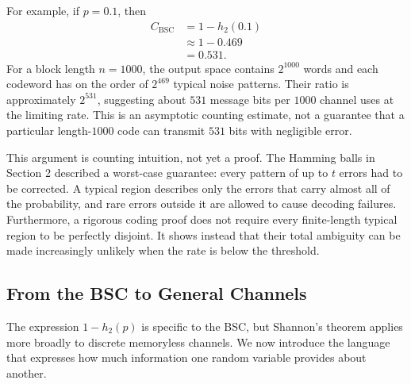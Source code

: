 For example, if $p=0.1$, then
\begin{align}
C_{\mathrm{BSC}}
&=1-h_2(0.1)
\label{eq:bsc-capacity-point-one-substitution}\\
&\approx1-0.469
\label{eq:bsc-capacity-point-one-approximation}\\
&=0.531.
\label{eq:bsc-capacity-point-one-value}
\end{align}
For a block length $n=1000$, the output space contains $2^{1000}$ words and each codeword has on the order of $2^{469}$ typical noise patterns. Their ratio is approximately $2^{531}$, suggesting about $531$ message bits per $1000$ channel uses at the limiting rate. This is an asymptotic counting estimate, not a guarantee that a particular length-$1000$ code can transmit $531$ bits with negligible error.

This argument is counting intuition, not yet a proof. The Hamming balls in Section 2 described a worst-case guarantee: every pattern of up to $t$ errors had to be corrected. A typical region describes only the errors that carry almost all of the probability, and rare errors outside it are allowed to cause decoding failures. Furthermore, a rigorous coding proof does not require every finite-length typical region to be perfectly disjoint. It shows instead that their total ambiguity can be made increasingly unlikely when the rate is below the threshold.

\subsection{From the BSC to General Channels}
\label{subsec:general-channels}

The expression $1-h_2(p)$ is specific to the BSC, but Shannon's theorem applies more broadly to discrete memoryless channels. We now introduce the language that expresses how much information one random variable provides about another.


